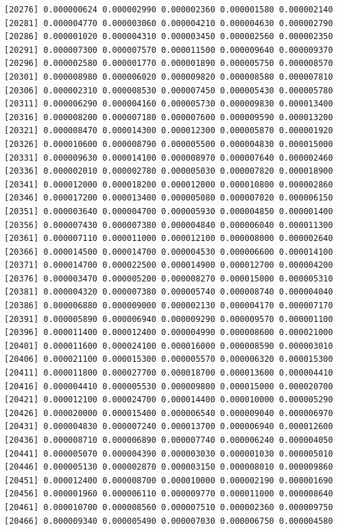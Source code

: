 \documentclass[]{article}
\begin{document}
\begin{verbatim}
[20276] 0.000000624 0.000002990 0.000002360 0.000001580 0.000002140
[20281] 0.000004770 0.000003060 0.000004210 0.000004630 0.000002790
[20286] 0.000001020 0.000004310 0.000003450 0.000002560 0.000002350
[20291] 0.000007300 0.000007570 0.000011500 0.000009640 0.000009370
[20296] 0.000002580 0.000001770 0.000001890 0.000005750 0.000008570
[20301] 0.000008980 0.000006020 0.000009820 0.000008580 0.000007810
[20306] 0.000002310 0.000008530 0.000007450 0.000005430 0.000005780
[20311] 0.000006290 0.000004160 0.000005730 0.000009830 0.000013400
[20316] 0.000008200 0.000007180 0.000007600 0.000009590 0.000013200
[20321] 0.000008470 0.000014300 0.000012300 0.000005870 0.000001920
[20326] 0.000010600 0.000008790 0.000005500 0.000004830 0.000015000
[20331] 0.000009630 0.000014100 0.000008970 0.000007640 0.000002460
[20336] 0.000002010 0.000002780 0.000005030 0.000007820 0.000018900
[20341] 0.000012000 0.000018200 0.000012000 0.000010800 0.000002860
[20346] 0.000017200 0.000013400 0.000005080 0.000007020 0.000006150
[20351] 0.000003640 0.000004700 0.000005930 0.000004850 0.000001400
[20356] 0.000007430 0.000007380 0.000004840 0.000006040 0.000011300
[20361] 0.000007110 0.000011000 0.000012100 0.000008000 0.000002640
[20366] 0.000014500 0.000014700 0.000004530 0.000006600 0.000014100
[20371] 0.000014700 0.000022500 0.000014900 0.000012700 0.000004200
[20376] 0.000003470 0.000005200 0.000008270 0.000015000 0.000005310
[20381] 0.000004320 0.000007380 0.000005740 0.000008740 0.000004040
[20386] 0.000006880 0.000009000 0.000002130 0.000004170 0.000007170
[20391] 0.000005890 0.000006940 0.000009290 0.000009570 0.000001100
[20396] 0.000011400 0.000012400 0.000004990 0.000008600 0.000021000
[20401] 0.000011600 0.000024100 0.000016000 0.000008590 0.000003010
[20406] 0.000021100 0.000015300 0.000005570 0.000006320 0.000015300
[20411] 0.000011800 0.000027700 0.000018700 0.000013600 0.000004410
[20416] 0.000004410 0.000005530 0.000009800 0.000015000 0.000020700
[20421] 0.000012100 0.000024700 0.000014400 0.000010000 0.000005290
[20426] 0.000020000 0.000015400 0.000006540 0.000009040 0.000006970
[20431] 0.000004830 0.000007240 0.000013700 0.000006940 0.000012600
[20436] 0.000008710 0.000006890 0.000007740 0.000006240 0.000004050
[20441] 0.000005070 0.000004390 0.000003030 0.000001030 0.000005010
[20446] 0.000005130 0.000002870 0.000003150 0.000008010 0.000009860
[20451] 0.000012400 0.000008700 0.000010000 0.000002190 0.000001690
[20456] 0.000001960 0.000006110 0.000009770 0.000011000 0.000008640
[20461] 0.000010700 0.000008560 0.000007510 0.000002360 0.000009750
[20466] 0.000009340 0.000005490 0.000007030 0.000006750 0.000004580

\end{verbatim}
\end{document}
